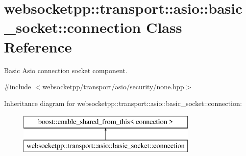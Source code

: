 \hypertarget{classwebsocketpp_1_1transport_1_1asio_1_1basic__socket_1_1connection}{}\section{websocketpp\+:\+:transport\+:\+:asio\+:\+:basic\+\_\+socket\+:\+:connection Class Reference}
\label{classwebsocketpp_1_1transport_1_1asio_1_1basic__socket_1_1connection}


Basic Asio connection socket component.  




{\ttfamily \#include $<$websocketpp/transport/asio/security/none.\+hpp$>$}

Inheritance diagram for websocketpp\+:\+:transport\+:\+:asio\+:\+:basic\+\_\+socket\+:\+:connection\+:\begin{figure}[H]
\begin{center}
\leavevmode
\includegraphics[height=2.000000cm]{classwebsocketpp_1_1transport_1_1asio_1_1basic__socket_1_1connection}
\end{center}
\end{figure}
